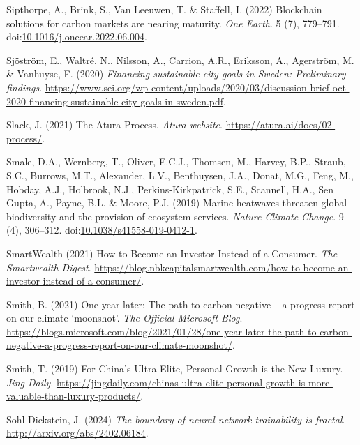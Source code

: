 \documentclass[
  letterpaper,
  DIV=11,
  numbers=noendperiod]{scrartcl}
\newlength{\cslhangindent}
\newenvironment{CSLReferences}[2] %
 {\begin{list}{}{%
  \setlength{\itemindent}{0pt}
  \setlength{\leftmargin}{0pt}
  \setlength{\parsep}{0pt}
  \ifodd #1
   \setlength{\leftmargin}{\cslhangindent}
   \setlength{\itemindent}{-1\cslhangindent}
  \fi
  \setlength{\itemsep}{#2\baselineskip}}}
 {\end{list}}
\begin{document}
\begin{CSLReferences}{0}{1}
Sipthorpe, A., Brink, S., Van Leeuwen, T. \& Staffell, I. (2022)
Blockchain solutions for carbon markets are nearing maturity. \emph{One
Earth}. 5 (7), 779--791.
doi:\href{https://doi.org/10.1016/j.oneear.2022.06.004}{10.1016/j.oneear.2022.06.004}.

Sjöström, E., Waltré, N., Nilsson, A., Carrion, A.R., Eriksson, A.,
Agerström, M. \& Vanhuyse, F. (2020) \emph{Financing sustainable city
goals in {Sweden}: Preliminary findings}.
\url{https://www.sei.org/wp-content/uploads/2020/03/discussion-brief-oct-2020-financing-sustainable-city-goals-in-sweden.pdf}.

Slack, J. (2021) The {Atura Process}. \emph{Atura website}.
\url{https://atura.ai/docs/02-process/}.

Smale, D.A., Wernberg, T., Oliver, E.C.J., Thomsen, M., Harvey, B.P.,
Straub, S.C., Burrows, M.T., Alexander, L.V., Benthuysen, J.A., Donat,
M.G., Feng, M., Hobday, A.J., Holbrook, N.J., Perkins-Kirkpatrick, S.E.,
Scannell, H.A., Sen Gupta, A., Payne, B.L. \& Moore, P.J. (2019) Marine
heatwaves threaten global biodiversity and the provision of ecosystem
services. \emph{Nature Climate Change}. 9 (4), 306--312.
doi:\href{https://doi.org/10.1038/s41558-019-0412-1}{10.1038/s41558-019-0412-1}.

SmartWealth (2021) How to {Become} an {Investor Instead} of a
{Consumer}. \emph{The Smartwealth Digest}.
\url{https://blog.nbkcapitalsmartwealth.com/how-to-become-an-investor-instead-of-a-consumer/}.

Smith, B. (2021) One year later: {The} path to carbon negative -- a
progress report on our climate {`moonshot'}. \emph{The Official
Microsoft Blog}.
\url{https://blogs.microsoft.com/blog/2021/01/28/one-year-later-the-path-to-carbon-negative-a-progress-report-on-our-climate-moonshot/}.

Smith, T. (2019) For {China}'s {Ultra Elite}, {Personal Growth} is the
{New Luxury}. \emph{Jing Daily}.
\url{https://jingdaily.com/chinas-ultra-elite-personal-growth-is-more-valuable-than-luxury-products/}.

Sohl-Dickstein, J. (2024) \emph{The boundary of neural network
trainability is fractal}. \url{http://arxiv.org/abs/2402.06184}.


\end{CSLReferences}
\end{document}
